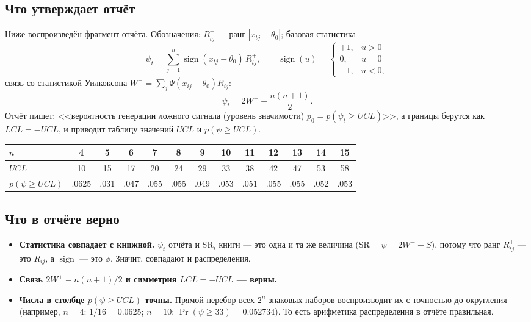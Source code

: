 \documentclass[11pt,a4paper]{article}
\newcommand{\SR}{\mathrm{SR}}
\begin{document}
\subsection{Что утверждает отчёт}

Ниже воспроизведён фрагмент отчёта. Обозначения: $R^{+}_{tj}$ --- ранг
$|x_{tj}-\theta_0|$; базовая статистика
\begin{equation}
\psi_t=\sum_{j=1}^{n}\operatorname{sign}(x_{tj}-\theta_0)\,R^{+}_{tj},
\qquad
\operatorname{sign}(u)=\begin{cases}+1,&u>0\\0,&u=0\\-1,&u<0,\end{cases}
\end{equation}
связь со статистикой Уилкоксона $W^{+}=\sum_j\Psi(x_{ij}-\theta_0)R_{ij}$:
\begin{equation}
\psi_t = 2W^{+}-\frac{n(n+1)}{2}.
\end{equation}
Отчёт пишет: <<вероятность генерации ложного сигнала (уровень
значимости) $p_0=p(\psi_t\ge UCL)$>>, а границы берутся как
$LCL=-UCL$, и приводит таблицу значений $UCL$ и $p(\psi\ge UCL)$.

\begin{center}\small
\renewcommand{\arraystretch}{1.15}
\begin{tabular}{lcccccccccccc}
\toprule
$n$ & 4 & 5 & 6 & 7 & 8 & 9 & 10 & 11 & 12 & 13 & 14 & 15\\
\midrule
$UCL$ & 10 & 15 & 17 & 20 & 24 & 29 & 33 & 38 & 42 & 47 & 53 & 58\\
$p(\psi\ge UCL)$ & .0625 & .031 & .047 & .055 & .055 & .049 & .053 & .051 & .055 & .055 & .052 & .053\\
\bottomrule
\end{tabular}
\end{center}

\subsection{Что в отчёте верно}

\begin{itemize}
\item \textbf{Статистика совпадает с книжной.}
$\psi_t$ отчёта и $\SR_i$ книги --- это одна и та же величина
($\SR=\psi=2W^{+}-S$), потому что ранг $R^{+}_{tj}$ --- это $R_{ij}$,
а $\operatorname{sign}$ --- это $\phi$. Значит, совпадают и
распределения.
\item \textbf{Связь $2W^{+}-n(n+1)/2$ и симметрия $LCL=-UCL$ --- верны.}
\item \textbf{Числа в столбце $p(\psi\ge UCL)$ точны.} Прямой перебор
всех $2^n$ знаковых наборов воспроизводит их с точностью до округления
(например, $n=4$: $1/16=0.0625$; $n=10$: $\Pr(\psi\ge33)=0.052734$).
То есть арифметика распределения в отчёте правильная.
\end{itemize}
\end{document}
